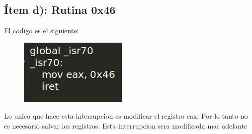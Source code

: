 \subsection{Ítem d): Rutina 0x46}


El codigo es el siguiente:
\begin{figure}[H]
\begin{center}
  \includegraphics[width=\linewidth]{ejercicio5/rutina0x46.png}
\endminipage
\end{center}
\end{figure}

Lo unico que hace esta interrupcion es modificar el registro eax. Por lo tanto no es necesario salvar los registros. Esta interrupcion sera modificada mas adelante
